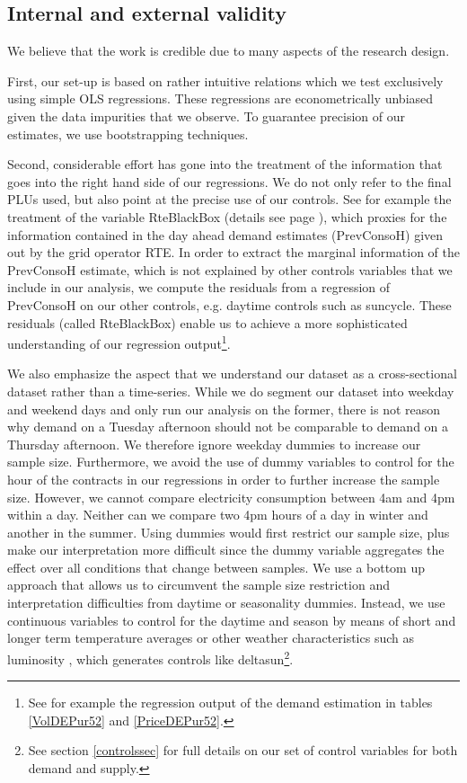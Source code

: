 \subsection{Internal and external validity}
\label{internal}

We believe that the work is credible due to many aspects of the research design. 

First, our set-up is based on rather intuitive relations which we test exclusively using simple OLS regressions. These regressions are econometrically unbiased given the data impurities that we observe. To guarantee precision of our estimates, we use bootstrapping techniques. 

Second, considerable effort has gone into the treatment of the information that goes into the right hand side of our regressions. We do not only refer to the final PLUs used, but also point at the precise use of our controls. See for example the treatment of the variable RteBlackBox (details see page \pageref{RteBlackBox}), which proxies for the information contained in the day ahead demand estimates (PrevConsoH) given out by the grid operator RTE. In order to extract the marginal information of the PrevConsoH estimate, which is not explained by other controls variables that we include in our analysis, we compute the residuals from a regression of PrevConsoH on our other controls, e.g. daytime controls such as suncycle. These residuals (called RteBlackBox) enable us to achieve a more sophisticated understanding of our regression output\footnote{See for example the regression output of the demand estimation in tables \ref{VolDEPur52} and \ref{PriceDEPur52}.}.

We also emphasize the aspect that we understand our dataset as a cross-sectional dataset rather than a time-series. 
\label{nodummies}
While we do segment our dataset into weekday and weekend days and only run our analysis on the former, there is not reason why demand on a Tuesday afternoon should not be comparable to demand on a Thursday afternoon. We therefore ignore weekday dummies to increase our sample size. 
Furthermore, we avoid the use of dummy variables to control for the hour of the contracts in our regressions in order to further increase the sample size. However, we cannot compare electricity consumption between 4am and 4pm within a day. Neither can we compare two 4pm hours of a day in winter and another in the summer. Using dummies would first restrict our sample size, plus make our interpretation more difficult since the dummy variable aggregates the effect over all conditions that change between samples. We use a bottom up approach that allows us to circumvent the sample size restriction and interpretation difficulties from daytime or seasonality dummies. Instead, we use continuous variables to control for the daytime and season by means of short and longer term temperature averages or other weather characteristics such as luminosity , which generates controls like deltasun\footnote{See section \ref{controlssec} for full details on our set of control variables for both demand and supply.}. 

